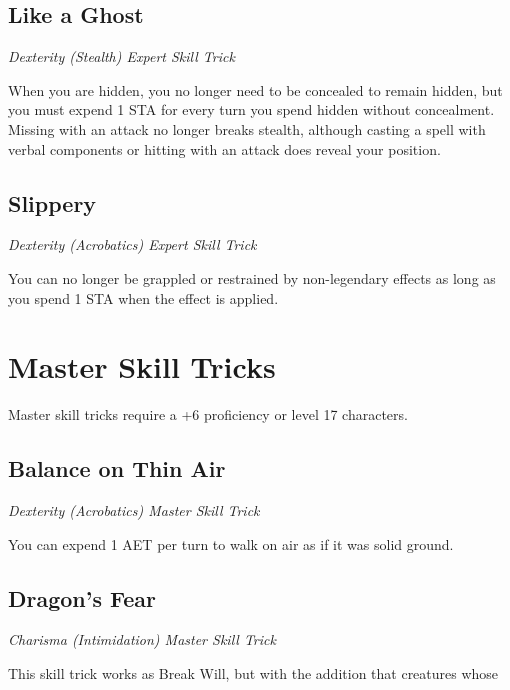 \subsection{Like a Ghost}

\textit{Dexterity (Stealth) Expert Skill Trick}

When you are hidden, you no longer need to be concealed to remain hidden, but you must expend 1 STA for every turn you spend hidden without concealment. Missing with an attack no longer breaks stealth, although casting a spell with verbal components or hitting with an attack does reveal your position.

\subsection{Slippery}

\textit{Dexterity (Acrobatics) Expert Skill Trick}

You can no longer be grappled or restrained by non-legendary effects as long as you spend 1 STA when the effect is applied.

\section{Master Skill Tricks}
\label{sec:skill-tricks-master}

Master skill tricks require a +6 proficiency or level 17 characters.
\subsection{Balance on Thin Air}

\textit{Dexterity (Acrobatics) Master Skill Trick}

You can expend 1 AET per turn to walk on air as if it was solid ground.

\subsection{Dragon's Fear}

\textit{Charisma (Intimidation) Master Skill Trick}

This skill trick works as Break Will, but with the addition that creatures whose CR is less than half your level automatically fail the saving throw and creatures higher than that have disadvantage on the saving throw.

\subsection{Friend to All}

